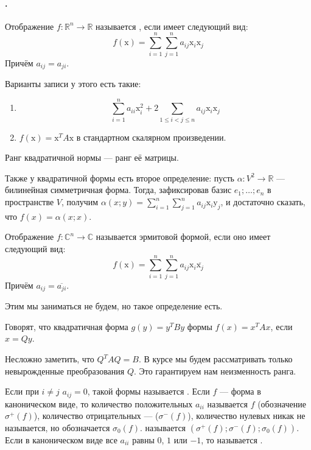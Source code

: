 \documentclass{article}
\begin{document}
    \paragraph{.}
    \begin{itemize}
        \dfn Отображение $f\colon\mathbb R^n\to\mathbb R$ называется , если имеет следующий вид:
        $$
        f(\mathrm x)=\sum\limits_{i=1}^n\sum\limits_{j=1}^na_{ij}\mathrm x_i\mathrm x_j
        $$
        Причём $a_{ij}=a_{ji}$.
        \begin{Comment}
            Варианты записи у этого есть такие:
            \begin{enumerate}
                \item $$\sum\limits_{i=1}^na_{ii}\mathrm x_i^2+2\sum\limits_{1\leqslant i<j\leqslant n}a_{ij}\mathrm x_i\mathrm x_j$$
                \item $f(\mathrm x)=\mathrm x^TA\mathrm x$ в стандартном скалярном произведении.
            \end{enumerate}
        \end{Comment}
        \dfn Ранг квадратичной нормы --- ранг её матрицы.
        \begin{Comment}
            Также у квадратичной формы есть второе определение: пусть $\alpha\colon V^2\to\mathbb R$ --- билинейная симметричная форма. Тогда, зафиксировав базис $e_1;\ldots;e_n$ в пространстве $V$, получим $\alpha(x;y)=\sum\limits_{i=1}^n\sum\limits_{j=1}^na_{ij}\mathrm x_i\mathrm y_j$, и достаточно сказать, что $f(x)=\alpha(x;x)$.
        \end{Comment}
        \dfn Отображение $f\colon\mathbb C^n\to\mathbb C$ называется эрмитовой формой, если оно имеет следующий вид:
        $$
        f(\mathrm x)=\sum\limits_{i=1}^n\sum\limits_{j=1}^na_{ij}\mathrm x_i\overline{\mathrm x_j}
        $$
        Причём $a_{ij}=\overline{a_{ji}}$.
        \begin{Comment}
            Этим мы заниматься не будем, но такое определение есть.
        \end{Comment}
        \dfn Говорят, что квадратичная форма $g(y)=y^TBy$  формы $f(x)=x^TAx$, если $x=Qy$.
        \begin{Comment}
            Несложно заметить, что $Q^TAQ=B$. В курсе мы будем рассматривать только невырожденные преобразования $Q$. Это гарантируем нам неизменность ранга.
        \end{Comment}
        \dfn Если при $i\neq j$ $a_{ij}=0$, такой  формы называется .
        \dfn Если $f$ --- форма в каноническом виде, то количество положительных $a_{ii}$ называется   $f$ (обозначение $\sigma^+(f)$), количество отрицательных ---  ($\sigma^-(f)$), количество нулевых никак не называется, но обозначается $\sigma_0(f)$.  называется $(\sigma^+(f);\sigma^-(f);\sigma_0(f))$.
        \dfn Если в каноническом виде все $a_{ii}$ равны $0$, $1$ или $-1$, то  называется .
    \end{itemize}
\end{document}
